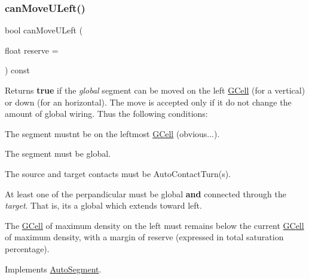 \mbox{\label{classKatabatic_1_1AutoHorizontal_a9b0c21eeb26c256876592ba63438da74}} 
\subsubsection{\texorpdfstring{can\+Move\+U\+Left()}{canMoveULeft()}}
{\footnotesize\ttfamily bool can\+Move\+U\+Left (\begin{DoxyParamCaption}\item[{float}]{reserve = {} }\end{DoxyParamCaption}) const\hspace{0.3cm}{\ttfamily [virtual]}}

\begin{DoxyReturn}{Returns}
{\bfseries true} if the {\itshape global} segment can be moved on the left \hyperlink{classKatabatic_1_1GCell}{G\+Cell} (for a vertical) or down (for an horizontal). The move is accepted only if it do not change the amount of global wiring. Thus the following conditions\+:
\begin{DoxyItemize}
\item The segment mustn\textquotesingle{}t be on the leftmost \hyperlink{classKatabatic_1_1GCell}{G\+Cell} (obvious...).
\item The segment must be global.
\item The source and target contacts must be Auto\+Contact\+Turn(s).
\item At least one of the perpandicular must be global {\bfseries and} connected through the {\itshape target}. That is, it\textquotesingle{}s a global which extends toward left.
\item The \hyperlink{classKatabatic_1_1GCell}{G\+Cell} of maximum density on the left must remains below the current \hyperlink{classKatabatic_1_1GCell}{G\+Cell} of maximum density, with a margin of {\ttfamily reserve} (expressed in total saturation percentage). 
\end{DoxyItemize}
\end{DoxyReturn}


Implements \hyperlink{classKatabatic_1_1AutoSegment_aad55626c9d793a0b08bcff5be2a5ad0c}{Auto\+Segment}.




